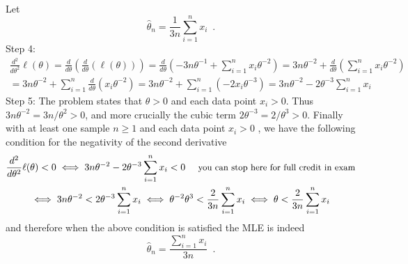 \begin{Answer}
\begin{enumerate}
\begin{multline*}
\end{multline*}
Let $$\widehat{\theta}_n =  \frac{1}{3n} \sum_{i=1}^n x_i \enspace .$$
{\sf Step 4:}
\begin{multline*}
\frac{d^2}{d \theta^2} \ell(\theta) = \frac{d}{d \theta} \left( \frac{d}{d \theta} \left( \ell(\theta)\right)\right)
=  \frac{d}{d \theta} \left( - 3 n \theta^{-1} + \sum_{i=1}^n x_i \theta^{-2}\right)
=   3 n \theta^{-2} + \frac{d}{d \theta} \left(\sum_{i=1}^n x_i \theta^{-2}\right)\\
=   3 n \theta^{-2} + \sum_{i=1}^n \frac{d}{d \theta} \left( x_i \theta^{-2}\right)
=   3 n \theta^{-2} + \sum_{i=1}^n  \left( -2 x_i \theta^{-3}\right)
=   3 n \theta^{-2} - 2 \theta^{-3} \sum_{i=1}^n  x_i
\end{multline*}
{\sf Step 5:}
The problem states that $\theta > 0$ and each data point $x_i>0$.  
Thus $3 n \theta^{-2}=3n/\theta^2 > 0$, and more crucially the cubic term $2 \theta^{-3}=2/\theta^3 > 0$.  
Finally with at least one sample $n \geq 1$ and each data point $x_i>0$ , we have the following condition for the negativity of the second derivative 
\begin{multline*}
\frac{d^2}{d \theta^2} \ell(\theta) <0
\iff
3 n \theta^{-2} - 2 \theta^{-3} \sum_{i=1}^n  x_i  < 0 \quad {\text{ \small you can stop here for full credit in exam}}\\
\iff
3 n \theta^{-2} < 2 \theta^{-3} \sum_{i=1}^n  x_i  
\iff
\theta^{-2}\theta^3 < \frac{2}{3n} \sum_{i=1}^n  x_i  
\iff
\theta < \frac{2}{3n} \sum_{i=1}^n  x_i  
\end{multline*}
and therefore when the above condition is satisfied the MLE is indeed
$$\widehat{\theta}_n = \frac{\sum_{i=1}^n x_i}{3n} \enspace .$$


\end{enumerate}
\end{Answer}
